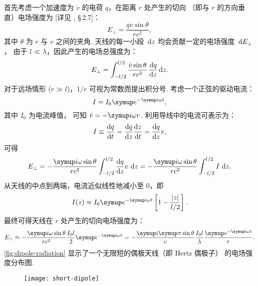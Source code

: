 首先考虑一个加速度为 $\dot{v}$ 的电荷 $q$，在距离 $r$ 处产生的切向
（即与 $r$ 的方向垂直）电场强度为 [详见 , \S\,2.7]：
\begin{equation}
  \label{eq:q-efield}
  E_{\bot} = \frac{q \dot{v} \sin\theta}{r c^2} ,
\end{equation}
其中 $\theta$ 为 $r$ 与 $v$ 之间的夹角.
天线的每一小段 $\,\mathrm{d}z$ 均会贡献一定的电场强度 $\,\mathrm{d}E_{\bot}$，
由于 $l \ll \lambda$，因此产生的电场总强度为：
\begin{equation}
  \label{eq:dipole-efield1}
  E_{\bot} = \int_{-l/2}^{l/2}
    \frac{\dot{v} \sin\theta}{r c^2} \,\frac{\mathrm{d}q}{\mathrm{d}z}\,\mathrm{d}z .
\end{equation}
对于远场情形 ($r \gg l$)，$1/r$ 可视为常数而提出积分号.
考虑一个正弦的驱动电流：
\begin{equation}
  \label{eq:dipole-current}
  I = I_0 \Ce^{-\Ci \omega t} ,
\end{equation}
其中 $I_0$ 为电流峰值，
可知 $\dot{v} = -\Ci \omega v$.
利用导线中的电流可表示为：
\begin{equation}
  \label{eq:wire-current}
  I \equiv \frac{\mathrm{d}q}{\mathrm{d}t} = \frac{\mathrm{d}q}{\mathrm{d}z} \frac{\mathrm{d}z}{\mathrm{d}t} = \frac{\mathrm{d}q}{\mathrm{d}z} v ,
\end{equation}
可得
\begin{equation}
  \label{eq:dipole-efield2}
  E_{\bot}
    = -\frac{\Ci\omega \sin\theta}{r c^2}
      \int_{-l/2}^{l/2} \diff{q}{z} v \,\D{z}
    = -\frac{\Ci\omega \sin\theta}{r c^2} \int_{-l/2}^{l/2} I\,\D{z} .
\end{equation}
从天线的中点到两端，电流近似线性地减小至 0，即
\begin{equation}
  \label{eq:dipole-current-dist}
  I(z) \approx I_0 \Ce^{-\Ci\omega t}
    \left[ 1 - \frac{|z|}{l/2} \right] .
\end{equation}
最终可得天线在 $r$ 处产生的切向电场强度为：
\begin{equation}
  \label{eq:dipole-efield}
  E_{\bot} \approx
    -\frac{\Ci\omega \sin\theta}{r c^2} \frac{I_0 l}{2} \Ce^{-\Ci\omega t}
    = -\frac{\Ci\Cpi \sin\theta}{c} \frac{I_0 l}{\lambda}
      \frac{\Ce^{-\Ci\omega t}}{r} .
\end{equation}
\autoref{fig:dipole-radiation} 显示了一个无限短的偶极天线（即 Hertz 偶极子）
的电场强度分布图.

\begin{figure}[htp]
  \centering
  \texttt{[image: short-dipole]}
  \label{fig:short-dipole}
\end{figure}

